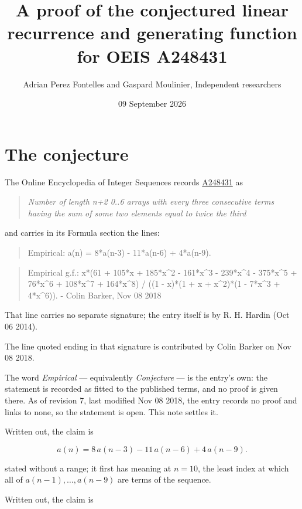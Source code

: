 \documentclass[11pt]{article}
\title{A proof of the conjectured linear recurrence and generating function for OEIS A248431}
\author{Adrian Perez Fontelles and Gaspard Moulinier, Independent researchers}
\date{09 September 2026}
\theoremstyle{definition}
\begin{document}
\maketitle
\section{The conjecture}

The Online Encyclopedia of Integer Sequences records \href{https://oeis.org/A248431}{A248431} as

\begin{quote}\itshape Number of length n+2 0..6 arrays with every three consecutive terms having the sum of some two elements equal to twice the third\end{quote}

and carries in its Formula section the lines:

\begin{quote}\ttfamily Empirical: a(n) = 8*a(n-3) - 11*a(n-6) + 4*a(n-9).\end{quote}

\begin{quote}\ttfamily Empirical g.f.: x*(61 + 105*x + 185*x\textasciicircum{}2 - 161*x\textasciicircum{}3 - 239*x\textasciicircum{}4 - 375*x\textasciicircum{}5 + 76*x\textasciicircum{}6 + 108*x\textasciicircum{}7 + 164*x\textasciicircum{}8) / ((1 - x)*(1 + x + x\textasciicircum{}2)*(1 - 7*x\textasciicircum{}3 + 4*x\textasciicircum{}6)). - Colin Barker, Nov 08 2018\end{quote}

That line carries no separate signature; the entry itself is by R. H. Hardin (Oct 06 2014).

The line quoted ending in that signature is contributed by Colin Barker on Nov 08 2018.

The word {\itshape Empirical} --- equivalently {\itshape Conjecture} --- is the entry's own: the statement is recorded as fitted to the published terms, and no proof is given there. As of revision 7, last modified Nov 08 2018, the entry records no proof and links to none, so the statement is open. This note settles it.

Written out, the claim is

\[a(n) = 8\,a(n-3) - 11\,a(n-6) + 4\,a(n-9).\]

stated without a range; it first has meaning at $n = 10$, the least index at which all of $a(n-1),\dots,a(n-9)$ are terms of the sequence.

Written out, the claim is
\end{document}

